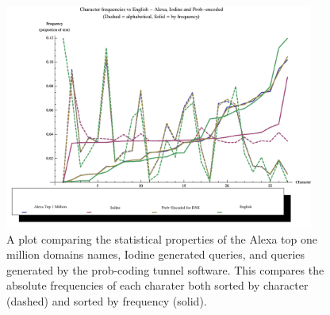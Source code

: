 \documentclass[12pt]{report}
\theoremstyle{remark}
\theoremstyle{definition}
\theoremstyle{definition}
\theoremstyle{definition}
\begin{document}
\begin{figure}
\centering
\includegraphics[width=4in]{figures/alexa_iodine_prob_v_english-a.pdf}
\caption[DNS Query, Iodine and Prob-coded Comparison - Absolute]{A plot comparing the statistical properties of the Alexa top one million domains names, Iodine generated queries, and queries generated by the prob-coding tunnel software. This compares the absolute frequencies of each charater both sorted by character (dashed) and sorted by frequency (solid).}
\label{FIGURE_alexa-iodine-prob-v-english-a}
\end{figure}
\end{document}
